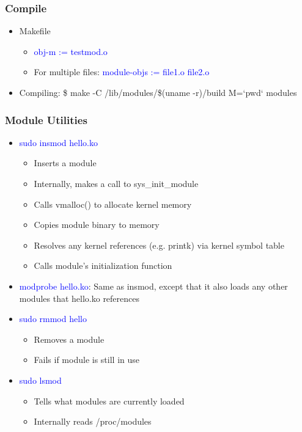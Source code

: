 \documentclass[12pt]{article}
\begin{document}
\subsubsection{Compile}
\begin{itemize}
    \item Makefile \begin{itemize}
        \item \textcolor{blue}{obj-m := testmod.o}
        \item For multiple files: \textcolor{blue}{module-objs := file1.o file2.o}
    \end{itemize}
    \item Compiling: \$ make -C /lib/modules/\$(uname -r)/build M=`pwd` modules
\end{itemize}
\subsubsection{Module Utilities}
\begin{itemize}
    \item \textcolor{blue}{sudo insmod hello.ko} \begin{itemize}
        \item Inserts a module
        \item Internally, makes a call to sys\_init\_module
        \item Calls vmalloc() to allocate kernel memory
        \item Copies module binary to memory
        \item Resolves any kernel references (e.g. printk) via kernel symbol table
        \item Calls module’s initialization function
    \end{itemize}
    \item \textcolor{blue}{modprobe hello.ko}: Same as insmod, except that it also loads any other modules that hello.ko references
    \item \textcolor{blue}{sudo rmmod hello} \begin{itemize}
        \item Removes a module
        \item Fails if module is still in use
    \end{itemize}
    \item \textcolor{blue}{sudo lsmod} \begin{itemize}
        \item Tells what modules are currently loaded 
        \item Internally reads /proc/modules
    \end{itemize}
\end{itemize}
\end{document}
